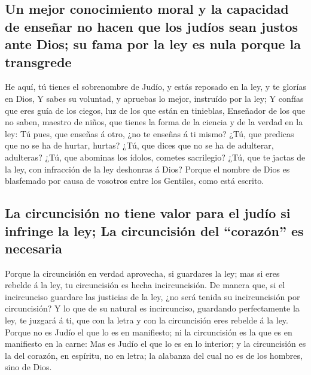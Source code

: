 \hypertarget{un-mejor-conocimiento-moral-y-la-capacidad-de-enseuxf1ar-no-hacen-que-los-juduxedos-sean-justos-ante-dios-su-fama-por-la-ley-es-nula-porque-la-transgrede}{%
\subsection{Un mejor conocimiento moral y la capacidad de enseñar no
hacen que los judíos sean justos ante Dios; su fama por la ley es nula
porque la
transgrede}\label{un-mejor-conocimiento-moral-y-la-capacidad-de-enseuxf1ar-no-hacen-que-los-juduxedos-sean-justos-ante-dios-su-fama-por-la-ley-es-nula-porque-la-transgrede}}

 He aquí, tú tienes el sobrenombre de Judío, y estás
reposado en la ley, y te glorías en Dios,  Y sabes su
voluntad, y apruebas lo mejor, instruído por la ley;  Y
confías que eres guía de los ciegos, luz de los que están en tinieblas,
 Enseñador de los que no saben, maestro de niños, que
tienes la forma de la ciencia y de la verdad en la ley: 
Tú pues, que enseñas á otro, ¿no te enseñas á ti mismo? ¿Tú, que
predicas que no se ha de hurtar, hurtas?  ¿Tú, que dices
que no se ha de adulterar, adulteras? ¿Tú, que abominas los ídolos,
cometes sacrilegio?  ¿Tú, que te jactas de la ley, con
infracción de la ley deshonras á Dios?  Porque el nombre
de Dios es blasfemado por causa de vosotros entre los Gentiles, como
está escrito.

\hypertarget{la-circuncisiuxf3n-no-tiene-valor-para-el-juduxedo-si-infringe-la-ley-la-circuncisiuxf3n-del-corazuxf3n-es-necesaria}{%
\subsection{La circuncisión no tiene valor para el judío si infringe la
ley; La circuncisión del ``corazón'' es
necesaria}\label{la-circuncisiuxf3n-no-tiene-valor-para-el-juduxedo-si-infringe-la-ley-la-circuncisiuxf3n-del-corazuxf3n-es-necesaria}}

 Porque la circuncisión en verdad aprovecha, si guardares
la ley; mas si eres rebelde á la ley, tu circuncisión es hecha
incircuncisión.  De manera que, si el incircunciso
guardare las justicias de la ley, ¿no será tenida su incircuncisión por
circuncisión?  Y lo que de su natural es incircunciso,
guardando perfectamente la ley, te juzgará á ti, que con la letra y con
la circuncisión eres rebelde á la ley.  Porque no es
Judío el que lo es en manifiesto; ni la circuncisión es la que es en
manifiesto en la carne:  Mas es Judío el que lo es en lo
interior; y la circuncisión es la del corazón, en espíritu, no en letra;
la alabanza del cual no es de los hombres, sino de Dios.

